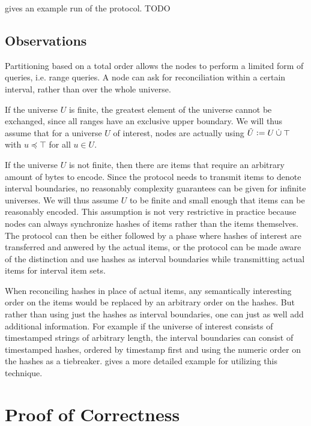  gives an example run of the protocol. TODO

\subsection{Observations}

Partitioning based on a total order allows the nodes to perform a limited form of queries, i.e. range queries. A node can ask for reconciliation within a certain interval, rather than over the whole universe.

If the universe $U$ is finite, the greatest element of the universe cannot be exchanged, since all ranges have an exclusive upper boundary. We will thus assume that for a universe $U$ of interest, nodes are actually using $\tilde{U} \vcentcolon= U \mathbin{\dot{\cup}} \top$ with $u \preceq \top$ for all $u \in U$.

If the universe $U$ is not finite, then there are items that require an arbitrary amount of bytes to encode. Since the protocol needs to transmit items to denote interval boundaries, no reasonably complexity guarantees can be given for infinite universes. We will thus assume $U$ to be finite and small enough that items can be reasonably encoded. This assumption is not very restrictive in practice because nodes can always synchronize hashes of items rather than the items themselves. The protocol can then be either followed by a phase where hashes of interest are transferred and anwered by the actual items, or the protocol can be made aware of the distinction and use hashes as interval boundaries while transmitting actual items for interval item sets.

When reconciling hashes in place of actual items, any semantically interesting order on the items would be replaced by an arbitrary order on the hashes. But rather than using just the hashes as interval boundaries, one can just as well add additional information. For example if the universe of interest consists of timestamped strings of arbitrary length, the interval boundaries can consist of timestamped hashes, ordered by timestamp first and using the numeric order on the hashes as a tiebreaker.  gives a more detailed example for utilizing this technique.

\section{Proof of Correctness}
\label{set-reconciliation-simple-correct}

